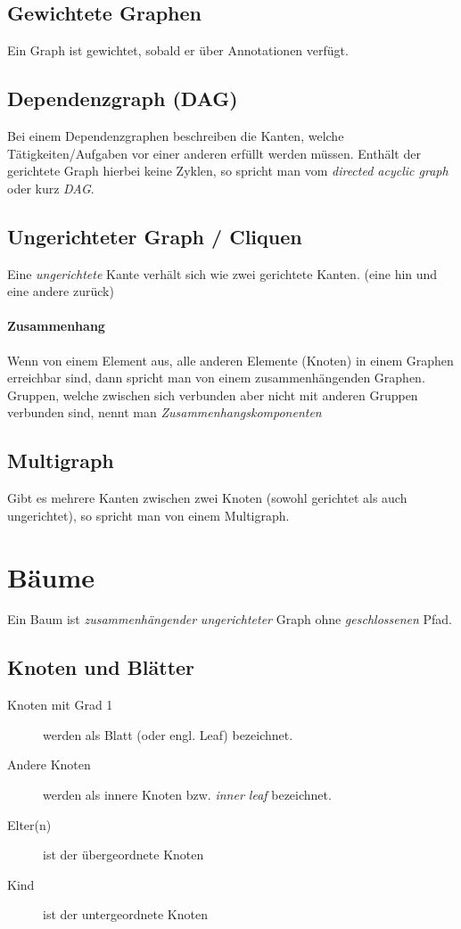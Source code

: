 \documentclass{book}
\begin{document}
\subsection{Gewichtete Graphen}
Ein Graph ist gewichtet, sobald er über Annotationen verfügt.
\subsection{Dependenzgraph (DAG)}
Bei einem Dependenzgraphen beschreiben die Kanten, welche Tätigkeiten/Aufgaben vor 
einer anderen erfüllt werden müssen.
Enthält der gerichtete Graph hierbei keine Zyklen, so spricht man vom \textit{directed acyclic graph} oder kurz \textit{DAG}.
\subsection{Ungerichteter Graph / Cliquen}
Eine \textit{ungerichtete} Kante verhält sich wie zwei gerichtete Kanten. (eine hin und eine andere zurück)

\paragraph{Zusammenhang} Wenn von einem Element aus, alle anderen Elemente (Knoten) in einem Graphen erreichbar sind,
dann spricht man von einem zusammenhängenden Graphen. Gruppen, welche zwischen sich verbunden aber nicht mit anderen Gruppen verbunden sind, nennt man \textit{Zusammenhangskomponenten}
\subsection{Multigraph} 
Gibt es mehrere Kanten zwischen zwei Knoten (sowohl gerichtet als auch ungerichtet), so spricht man von einem
Multigraph.
\section{Bäume}
Ein Baum ist \textit{zusammenhängender} \textit{ungerichteter} Graph ohne \textit{geschlossenen} Pfad.
\subsection{Knoten und Blätter}
\begin{description}
	\item[Knoten mit Grad 1]  werden als Blatt (oder engl. Leaf) bezeichnet.
	\item[Andere Knoten] werden als innere Knoten bzw. \textit{inner leaf} bezeichnet. 
	\item[Elter(n)] ist der übergeordnete Knoten
	\item[Kind] ist der untergeordnete Knoten 
\end{description}
\end{document}
